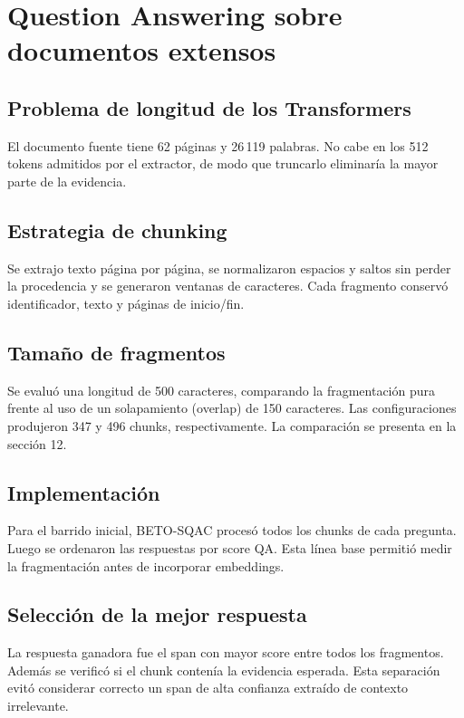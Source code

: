 \documentclass[12pt,letterpaper]{article}
\begin{document}
\section{Question Answering sobre documentos extensos}

\subsection{Problema de longitud de los Transformers}

El documento fuente tiene 62 páginas y 26\,119 palabras. No cabe en los 512
tokens admitidos por el extractor, de modo que truncarlo eliminaría la mayor
parte de la evidencia.

\subsection{Estrategia de chunking}

Se extrajo texto página por página, se normalizaron espacios y saltos sin
perder la procedencia y se generaron ventanas de caracteres. Cada fragmento
conservó identificador, texto y páginas de inicio/fin.

\subsection{Tamaño de fragmentos}

Se evaluó una longitud de 500 caracteres, comparando la fragmentación pura
frente al uso de un solapamiento (overlap) de 150 caracteres. Las configuraciones
produjeron 347 y 496 chunks, respectivamente. La comparación se presenta en la sección 12.

\subsection{Implementación}

Para el barrido inicial, BETO-SQAC procesó todos los chunks de cada pregunta.
Luego se ordenaron las respuestas por score QA. Esta línea base permitió medir
la fragmentación antes de incorporar embeddings.

\subsection{Selección de la mejor respuesta}

La respuesta ganadora fue el span con mayor score entre todos los fragmentos.
Además se verificó si el chunk contenía la evidencia esperada. Esta separación
evitó considerar correcto un span de alta confianza extraído de contexto
irrelevante.
\end{document}
